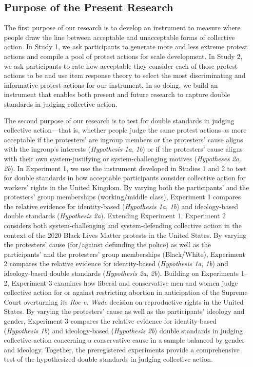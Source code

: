 \documentclass[twocolumn, 11pt, letterpaper]{article}
\begin{document}
\hypertarget{purpose-of-the-present-research}{%
\subsection{Purpose of the Present
Research}\label{purpose-of-the-present-research}}

The first purpose of our research is to develop an instrument to measure
where people draw the line between acceptable and unacceptable forms of
collective action. In Study 1, we ask participants to generate more and
less extreme protest actions and compile a pool of protest actions for
scale development. In Study 2, we ask participants to rate how
acceptable they consider each of those protest actions to be and use
item response theory to select the most discriminating and informative
protest actions for our instrument. In so doing, we build an instrument
that enables both present and future research to capture double
standards in judging collective action.

The second purpose of our research is to test for double standards in
judging collective action---that is, whether people judge the same
protest actions as more acceptable if the protesters' are ingroup
members or the protesters' cause aligns with the ingroup's interests
(\emph{Hypothesis 1a}, \emph{1b}) or if the protesters' cause aligns
with their own system-justifying or system-challenging motives
(\emph{Hypotheses 2a}, \emph{2b}). In Experiment 1, we use the
instrument developed in Studies 1 and 2 to test for double standards in
how acceptable participants consider collective action for workers'
rights in the United Kingdom. By varying both the participants' and the
protesters' group memberships (working/middle class), Experiment 1
compares the relative evidence for identity-based (\emph{Hypothesis 1a},
\emph{1b}) and ideology-based double standards (\emph{Hypothesis 2a}).
Extending Experiment 1, Experiment 2 considers both system-challenging
and system-defending collective action in the context of the 2020 Black
Lives Matter protests in the United States. By varying the protesters'
cause (for/against defunding the police) as well as the participants'
and the protesters' group memberships (Black/White), Experiment 2
compares the relative evidence for identity-based (\emph{Hypothesis 1a},
\emph{1b}) and ideology-based double standards (\emph{Hypothesis 2a},
\emph{2b}). Building on Experiments 1--2, Experiment 3 examines how
liberal and conservative men and women judge collective action for or
against restricting abortion in anticipation of the Supreme Court
overturning its \emph{Roe v. Wade} decision on reproductive rights in
the United States. By varying the protesters' cause as well as the
participants' ideology and gender, Experiment 3 compares the relative
evidence for identity-based (\emph{Hypothesis 1b}) and ideology-based
(\emph{Hypothesis 2b}) double standards in judging collective action
concerning a conservative cause in a sample balanced by gender and
ideology. Together, the preregistered experiments provide a
comprehensive test of the hypothesized double standards in judging
collective action.
\end{document}
